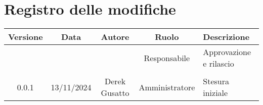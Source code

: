 
\section*{Registro delle modifiche}
\begin{table}[H]
    \begin{tabular}{|c|c|c|c|p{5cm}|}
        \hline
         \textbf{Versione} &  \textbf{Data} &  \textbf{Autore} &  \textbf{Ruolo} & \textbf{Descrizione} \\
          \hline
          &  &  & Responsabile & Approvazione e rilascio\\
          \hline
          &  &  &  &  \\
          \hline
          0.0.1 & 13/11/2024 & Derek Gusatto & Amministratore  & Stesura iniziale \\
          \hline
    \end{tabular}
\end{table}
